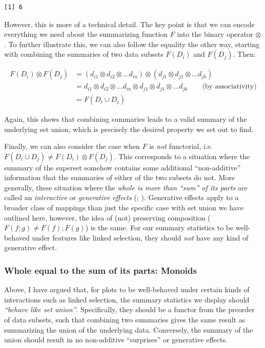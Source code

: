 \documentclass[
  openany]{book}
\theoremstyle{definition}
\theoremstyle{definition}
\theoremstyle{definition}
\theoremstyle{definition}
\theoremstyle{remark}
\begin{document}
\begin{verbatim}
[1] 6
\end{verbatim}

However, this is more of a technical detail. The key point is that we can encode everything we need about the summarizing function \(F\) into the binary operator \(\otimes\). To further illustrate this, we can also follow the equality the other way, starting with combining the summaries of two data subsets \(F(D_i)\) and \(F(D_j)\). Then:

\begin{align}
F(D_i) \otimes F(D_j) &= (d_{i1} \otimes d_{i2} \otimes \ldots d_{in}) \otimes (d_{j1} \otimes d_{j1} \otimes \ldots d_{jk}) \\
&= d_{i1} \otimes d_{i2} \otimes \ldots d_{in} \otimes d_{j1} \otimes d_{j1} \otimes \ldots d_{jk} \qquad \text{(by associativity)} \\
&= F(D_i \cup D_j)
\end{align}

Again, this shows that combining summaries leads to a valid summary of the underlying set union, which is precisely the desired property we set out to find.

Finally, we can also consider the case when \(F\) is \emph{not} functorial, i.e.~\(F(D_i \cup D_j) \neq F(D_i) \otimes F(D_j)\). This corresponds to a situation where the summary of the superset somehow contains some additional ``non-additive'' information that the summaries of either of the two subsets do not. More generally, these situation where the \emph{whole is more than ``sum'' of its parts} are called an \emph{interactive} or \emph{generative effects} (; ). Generative effects apply to a broader class of mappings than just the specific case with set union we have outlined here, however, the idea of (not) preserving composition (\(F(f ;g) \neq F(f) ;F(g)\)) is the same. For our summary statistics to be well-behaved under features like linked selection, they should \emph{not} have any kind of generative effect.

\subsubsection{Whole equal to the sum of its parts: Monoids}\label{monoids}

Above, I have argued that, for plots to be well-behaved under certain kinds of interactions such as linked selection, the summary statistics we display should \emph{``behave like set union''}. Specifically, they should be a functor from the preorder of data subsets, such that combining two summaries gives the same result as summarizing the union of the underlying data. Conversely, the summary of the union should result in no non-additive ``surprises'' or generative effects.
\end{document}
